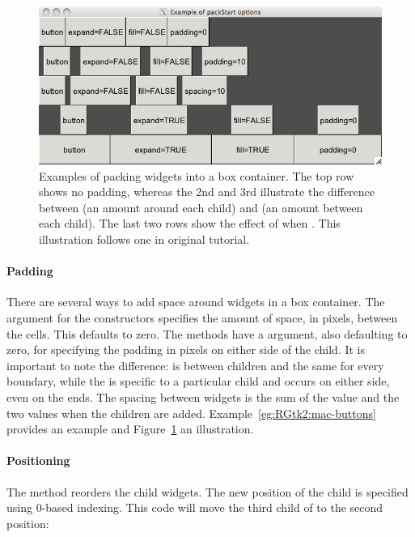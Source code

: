 \begin{figure}
  \centering
  \includegraphics[width=.8\textwidth]{ex-RGtk2-pack-start.png} 
  \caption{Examples of packing widgets into a box container. The top
    row shows no padding, whereas the 2nd and 3rd illustrate the
    difference between  (an amount around each child)
    and  (an amount between each child). The last two
    rows show the effect of  when . This
    illustration follows one in original \GTK\/ tutorial.}
  \label{fig:RGtk2-pack-start}
\end{figure}

\paragraph{Padding}
There are several ways to add space around widgets in a box container.
The  argument for the constructors
specifies the amount of space, in pixels, between the cells. This
defaults to zero. The  methods have a
 argument, also defaulting to zero,
for specifying the padding in pixels on either side of the child. It
is important to note the difference:  is between
children and the same for every boundary, while the  is
specific to a particular child and occurs on either side, even on the
ends. The spacing between widgets is the sum of the 
value and the two  values when the children are added.
Example~\ref{eg:RGtk2:mac-buttons} provides an example and
Figure~\ref{fig:RGtk2-pack-start} an illustration.

\paragraph{Positioning}
The  method reorders the child
widgets. The new position of the child is specified using 0-based
indexing. This code will move the third child of  to the second position:
\begin{Schunk}
\end{Schunk}

